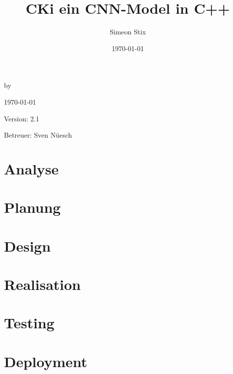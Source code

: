 \documentclass[a4paper,oneside,12pt]{report}
\title{CKi ein CNN-Model in C++}
\author{Simeon Stix}
\date{\today}
\renewcommand{\maketitle}{
\begin{titlepage}
    \begin{center}
        \vspace*{1cm}
        
        \Huge
        \textbf{\thetitle}
        
        \vspace{0.5cm}
        \Large
        by \theauthor
        
        \vspace{1.5cm}
        
        \today
        
        \vfill
        
        Version: 2.1
        
        \vspace{1cm}
        
        Betreuer: Sven Nüesch
        
    \end{center}
\end{titlepage}
}
\begin{document}
\maketitle

\tableofcontents %

\pagestyle{plain} %

\chapter{Analyse}
\label{sec:Analyse}


\chapter{Planung}
\label{sec:Planung}


\chapter{Design}
\label{sec:Design}


\chapter{Realisation}
\label{sec:Realisation}


\chapter{Testing}
\label{sec:Testing}


\chapter{Deployment}
\label{sec:Deployment}



\clearpage
{}
\nocite{*} %

\clearpage
{}
\listoffigures



\end{document}
